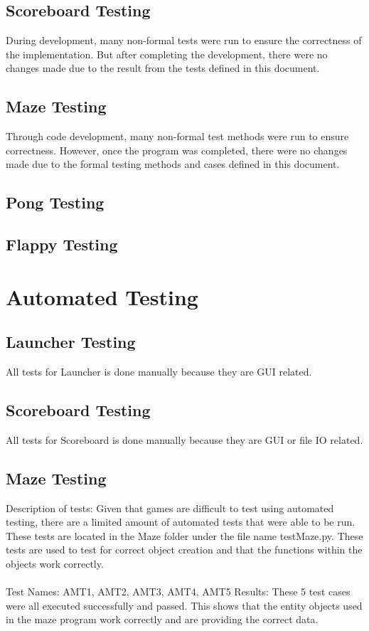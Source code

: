 \documentclass[12pt, titlepage]{article}
\begin{document}
	\subsection{Scoreboard Testing}
	During development, many non-formal tests were run to ensure the correctness of the implementation. But after completing the development, there were no changes made due to the result from the tests defined in this document.

	\subsection{Maze Testing}
	Through code development, many non-formal test methods were run to ensure correctness. However, once the program was completed, there were no changes made due to the formal testing methods and cases defined in this document.
	
	\subsection{Pong Testing}
	
	\subsection{Flappy Testing}

\section{Automated Testing}	

	\subsection{Launcher Testing}
	    All tests for Launcher is done manually because they are GUI related.
	    
	\subsection{Scoreboard Testing}
	    All tests for Scoreboard is done manually because they are GUI or file IO related.
		
	\subsection{Maze Testing}
		Description of tests: Given that games are difficult to test using automated testing, there are a limited amount of automated tests that were able to be run. These tests are located in the Maze folder under the file name testMaze.py. These tests are used to test for correct object creation and that the functions within the objects work correctly. \\ \\
		Test Names: AMT1, AMT2, AMT3, AMT4, AMT5
		Results: These 5 test cases were all executed successfully and passed. This shows that the entity objects used in the maze program work correctly and are providing the correct data.\\ \\
		
\end{document}
